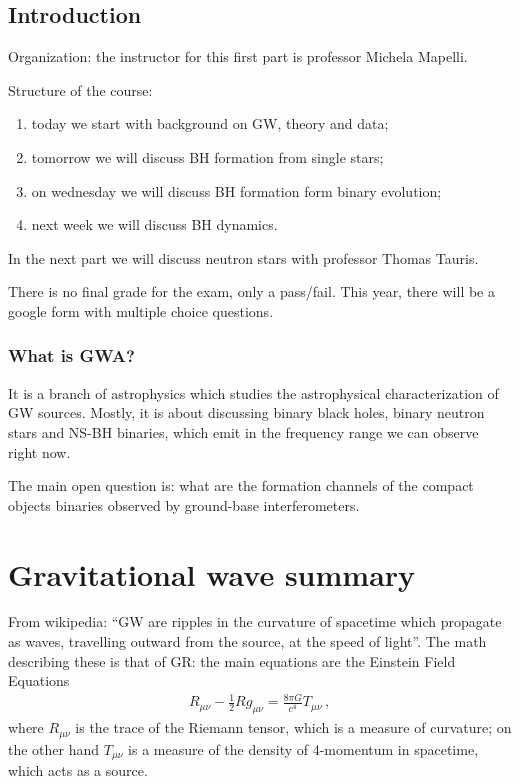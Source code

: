 \documentclass[main.tex]{subfiles}
\begin{document}
\section*{Introduction}


Organization: the instructor for this first part is professor Michela Mapelli. 

Structure of the course:
\begin{enumerate}
  \item today we start with background on GW, theory and data;
  \item tomorrow we will discuss BH formation from single stars;
  \item on wednesday we will discuss BH formation form binary evolution;
  \item next week we will discuss BH dynamics.
\end{enumerate}

In the next part we will discuss neutron stars with professor Thomas Tauris. 

There is no final grade for the exam, only a pass/fail. 
This year, there will be a google form with multiple choice questions. 

\subsection*{What is GWA?}

It is a branch of astrophysics which studies the astrophysical characterization of GW sources. 
Mostly, it is about discussing binary black holes, binary neutron stars and NS-BH binaries, which emit in the frequency range we can observe right now. 

The main open question is: what are the formation channels of the compact objects binaries observed by ground-base interferometers.

\chapter{Gravitational wave summary}

From wikipedia: ``GW are ripples in the curvature of spacetime which propagate as waves, travelling outward from the source, at the speed of light''.
The math describing these is that of GR: the main equations are the Einstein Field Equations 
%
\begin{align}
R_{\mu \nu } - \frac{1}{2} R g_{\mu \nu } = \frac{8 \pi G}{c^{4}} T_{\mu \nu }
\,,
\end{align}
%
where \(R_{\mu \nu }\) is the trace of the Riemann tensor, which is a measure of curvature; on the other hand \(T_{\mu \nu }\) is a measure of the density of \(4\)-momentum in spacetime, which acts as a source. 
\end{document}
